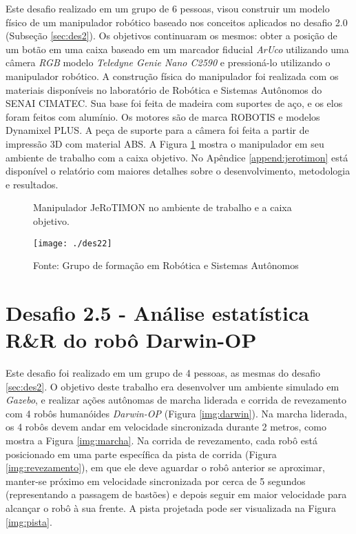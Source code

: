 Este desafio realizado em um grupo de 6 pessoas, visou construir um modelo físico de um manipulador robótico baseado nos conceitos aplicados no desafio 2.0 (Subseção \ref{sec:des2}). Os objetivos continuaram os mesmos: obter a posição de um botão em uma caixa baseado em um marcador fiducial \textit{ArUco} utilizando uma câmera \textit{RGB} modelo \textit{Teledyne Genie Nano C2590} e pressioná-lo utilizando o manipulador robótico. A construção física do manipulador foi realizada com os materiais disponíveis no laboratório de Robótica e Sistemas Autônomos do SENAI CIMATEC. Sua base foi feita de madeira com suportes de aço, e os elos foram feitos com alumínio. Os motores são de marca ROBOTIS e modelos Dynamixel PLUS. A peça de suporte para a câmera foi feita a partir de impressão 3D com material ABS. A Figura \ref{img:des22} mostra o manipulador em seu ambiente de trabalho com a caixa objetivo. No Apêndice \ref{append:jerotimon} está disponível o relatório com maiores detalhes sobre o desenvolvimento, metodologia e resultados.

\begin{figure} [H]												
    \centering
    \caption{Manipulador JeRoTIMON no ambiente de trabalho e a caixa objetivo.}	
	\texttt{[image: ./des22]}	
	\caption*{Fonte: Grupo de formação em Robótica e Sistemas Autônomos}
	\label{img:des22}									 
\end{figure}


\section{Desafio 2.5 - Análise estatística R\&R do robô Darwin-OP}
\label{sec:des25}

Este desafio foi realizado em um grupo de 4 pessoas, as mesmas do desafio \ref{sec:des2}. O objetivo deste trabalho era desenvolver um ambiente simulado em \textit{Gazebo}, e realizar ações autônomas de marcha liderada e corrida de revezamento com 4 robôs humanóides \textit{Darwin-OP} (Figura \ref{img:darwin}). Na marcha liderada, os 4 robôs devem andar em velocidade sincronizada durante 2 metros, como mostra a Figura \ref{img:marcha}. Na corrida de revezamento, cada robô está posicionado em uma parte específica da pista de corrida (Figura \ref{img:revezamento}), em que ele deve aguardar o robô anterior se aproximar, manter-se próximo em velocidade sincronizada por cerca de 5 segundos (representando a passagem de bastões) e depois seguir em maior velocidade para alcançar o robô à sua frente. A pista projetada pode ser visualizada na Figura \ref{img:pista}.

